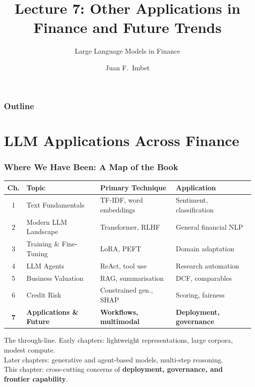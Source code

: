\documentclass[9pt,t]{beamer}
\title{Lecture 7: Other Applications in Finance and Future Trends}
\subtitle{Large Language Models in Finance}
\author{Juan F.\ Imbet}
\institute{Paris Dauphine -- PSL University}
\date{}
\begin{document}
\begin{frame}
\frametitle{}
\titlepage
\end{frame}

\begin{frame}
\frametitle{Outline}
\tableofcontents
\end{frame}

\section{LLM Applications Across Finance}

\begin{frame}
\frametitle{Where We Have Been: A Map of the Book}

\begin{center}
\small
\begin{tabular}{clll}
\toprule
\textbf{Ch.} & \textbf{Topic} & \textbf{Primary Technique} & \textbf{Application} \\
\midrule
1 & Text Fundamentals & TF-IDF, word embeddings & Sentiment, classification \\
2 & Modern LLM Landscape & Transformer, RLHF & General financial NLP \\
3 & Training \& Fine-Tuning & LoRA, PEFT & Domain adaptation \\
4 & LLM Agents & ReAct, tool use & Research automation \\
5 & Business Valuation & RAG, summarisation & DCF, comparables \\
6 & Credit Risk & Constrained gen., SHAP & Scoring, fairness \\
\textbf{7} & \textbf{Applications \& Future} & \textbf{Workflows, multimodal} & \textbf{Deployment, governance} \\
\bottomrule
\end{tabular}
\end{center}

\medskip
\begin{bigpicture}
  The through-line.
  Early chapters: lightweight representations, large corpora, modest compute.\\
  Later chapters: generative and agent-based models, multi-step reasoning.\\
  This chapter: cross-cutting concerns of \textbf{deployment, governance, and frontier capability}.
\end{bigpicture}
\end{frame}
\end{document}
